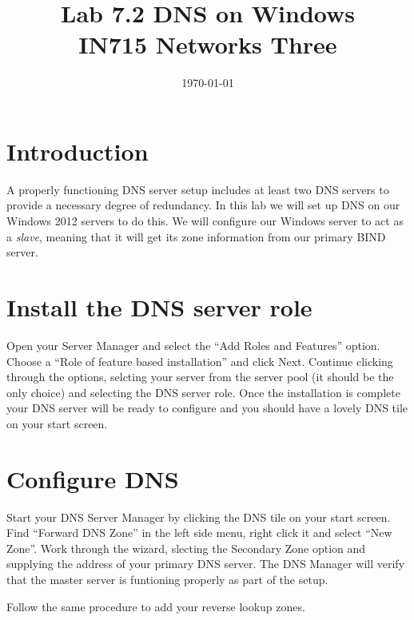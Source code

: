 \documentclass{article}
\begin{document}
\title{ Lab 7.2 DNS on Windows \\ IN715 Networks Three}
\date{\today}
\maketitle

\section*{Introduction}
A properly functioning DNS server setup includes at least two DNS servers to provide a necessary degree of redundancy.  In this lab we will set up DNS on our Windows 2012 servers to do this. We will configure our Windows server to act as a \emph{slave}, meaning that it will get its zone information from our primary BIND server.

\section{Install the DNS server role}
Open your Server Manager and select the ``Add Roles and Features'' option.  Choose a ``Role of feature based installation'' and click Next.  Continue clicking through the options, selcting your server from the server pool (it should be the only choice) and selecting the DNS server role.  Once the installation is complete your DNS server will be ready to configure and you should have a lovely DNS tile on your start screen.

\section{Configure DNS}
Start your DNS Server Manager by clicking the DNS tile on your start screen.  Find ``Forward DNS Zone'' in the left side menu, right click it and select ``New Zone''.  Work through the wizard, slecting the Secondary Zone option and supplying the address of your primary DNS server.  The DNS Manager will verify that the master server is funtioning properly as part of the setup.

Follow the same procedure to add your reverse lookup zones.
\end{document}
